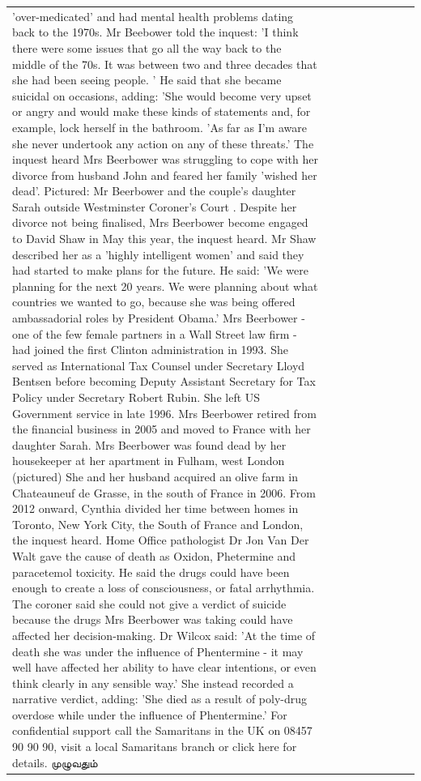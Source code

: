 \begin{table}[H]
\begin{tabular}{lllrlllll}
'over-medicated' and had mental health problems dating back to the 1970s. Mr Beebower told the inquest: 'I think there were some issues that go all the way back to the middle of the 70s. It was between two and three decades that she had been seeing people. ' He said that she became suicidal on occasions, adding: 'She would become very upset or angry and would make these kinds of statements and, for example, lock herself in the bathroom. 'As far as I'm aware she never undertook any action on any of these threats.' The inquest heard Mrs Beerbower was struggling to cope with her divorce from husband John and feared her family 'wished her dead'. Pictured: Mr Beerbower and the couple's daughter Sarah outside Westminster Coroner's Court . Despite her divorce not being finalised, Mrs Beerbower become engaged to David Shaw in May this year, the inquest heard. Mr Shaw described her as a 'highly intelligent women' and said they had started to make plans for the future. He said: 'We were planning for the next 20 years. We were planning about what countries we wanted to go, because she was being offered ambassadorial roles by President Obama.' Mrs Beerbower - one of the few female partners in a Wall Street law firm - had joined the first Clinton administration in 1993. She served as International Tax Counsel under Secretary Lloyd Bentsen before becoming Deputy Assistant Secretary for Tax Policy under Secretary Robert Rubin. She left US Government service in late 1996. Mrs Beerbower retired from the financial business in 2005 and moved to France with her daughter Sarah. Mrs Beerbower was found dead by her housekeeper at her apartment in Fulham, west London (pictured) She and her husband acquired an olive farm in Chateauneuf de Grasse, in the south of France in 2006. From 2012 onward, Cynthia divided her time between homes in Toronto, New York City, the South of France and London, the inquest heard. Home Office pathologist Dr Jon Van Der Walt gave the cause of death as Oxidon, Phetermine and paracetemol toxicity. He said the drugs could have been enough to create a loss of consciousness, or fatal arrhythmia. The coroner said she could not give a verdict of suicide because the drugs Mrs Beerbower was taking could have affected her decision-making. Dr Wilcox said: 'At the time of death she was under the influence of Phentermine - it may well have affected her ability to have clear intentions, or even think clearly in any sensible way.' She instead recorded a narrative verdict, adding: 'She died as a result of poly-drug overdose while under the influence of Phentermine.' For confidential support call the Samaritans in the UK on 08457 90 90 90, visit a local Samaritans branch or click here for details. முழுவதும் \\

\end{tabular}
\end{table}
